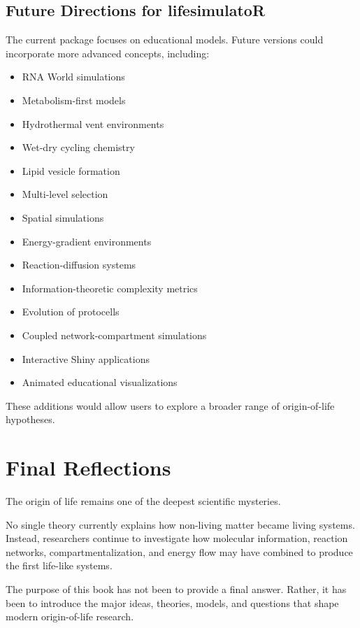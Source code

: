 \documentclass[
  oneside,
  openany]{book}
\providecommand{\tightlist}{%
  \setlength{\itemsep}{0pt}\setlength{\parskip}{0pt}}
\begin{document}
\subsection{Future Directions for lifesimulatoR}\label{future-directions-for-lifesimulator}

The current package focuses on educational models. Future versions could incorporate more advanced concepts, including:

\begin{itemize}
\tightlist
\item
  RNA World simulations
\item
  Metabolism-first models
\item
  Hydrothermal vent environments
\item
  Wet-dry cycling chemistry
\item
  Lipid vesicle formation
\item
  Multi-level selection
\item
  Spatial simulations
\item
  Energy-gradient environments
\item
  Reaction-diffusion systems
\item
  Information-theoretic complexity metrics
\item
  Evolution of protocells
\item
  Coupled network-compartment simulations
\item
  Interactive Shiny applications
\item
  Animated educational visualizations
\end{itemize}

These additions would allow users to explore a broader range of origin-of-life hypotheses.

\section{Final Reflections}\label{final-reflections}

The origin of life remains one of the deepest scientific mysteries.

No single theory currently explains how non-living matter became living systems. Instead, researchers continue to investigate how molecular information, reaction networks, compartmentalization, and energy flow may have combined to produce the first life-like systems.

The purpose of this book has not been to provide a final answer. Rather, it has been to introduce the major ideas, theories, models, and questions that shape modern origin-of-life research.
\end{document}
